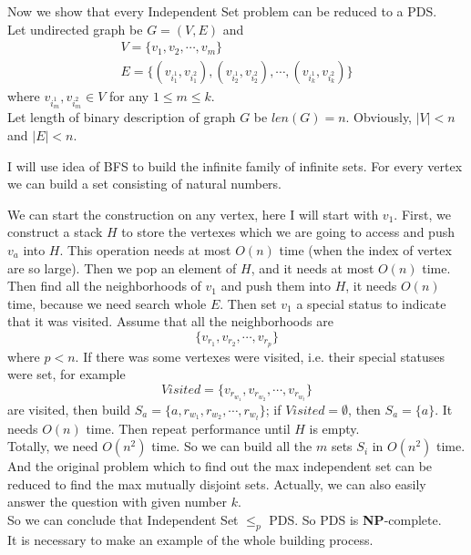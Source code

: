\documentclass[a4papper]{article}
\theoremstyle{neosn}
\begin{document}
    Now we show that every Independent Set problem can be reduced to a PDS. \\

    Let undirected graph be $G=(V,E)$ and
    \[
        \begin{array}{l}
            V =  \{v_1, v_2, \cdots, v_m\} \\
            E =  \{(v_{i_1^1}, v_{i_1^2}), (v_{i_2^1}, v_{i_2^2}), \cdots , (v_{i_k^1}, v_{i_k^2})\}
        \end{array}
    \]
    where $v_{i_m^1}, v_{i_m^2} \in V$ for any $1 \leqslant m \leqslant k$. \\

    Let length of binary description of graph $G$ be $len(G) = n$.
    Obviously, $|V| < n$ and $|E| < n$.

    I will use idea of BFS to build the infinite family of infinite sets.
    For every vertex we can build a set consisting of natural numbers.

    We can start the construction on any vertex, here I will start with $v_1$.
    First, we construct a stack $H$ to store the vertexes which we are going to access and push
    $v_a$ into $H$.
    This operation needs at most $O(n)$ time (when the index of vertex are so large).
    Then we pop an element of $H$, and it needs at most $O(n)$ time.\\
    Then find all the neighborhoods of $v_1$ and push them into $H$, it needs $O(n)$ time,
    because we need search whole $E$.
    Then set $v_1$ a special status to indicate that it was visited.
    Assume that all the neighborhoods are
    \[
        \{v_{r_1}, v_{r_2}, \cdots, v_{r_p}\}
    \]
    where $p < n$.
    If there was some vertexes were visited, i.e. their special statuses were set, for example
    \[
        Visited = \{v_{r_{w_1}}, v_{r_{w_2}}, \cdots, v_{r_{w_t}}\}
    \]
    are visited, then build $S_a = \{a, r_{w_1}, r_{w_2}, \cdots, r_{w_t}\}$;
    if $Visited = \emptyset$, then $S_a = \{a\}$.
    It needs $O(n)$ time.
    Then repeat performance until $H$ is empty.\\
    Totally, we need $O(n^2)$ time.
    So we can build all the $m$ sets $S_i$ in $O(n^2)$ time.
    And the original problem which to find out the max independent set can be reduced to find
    the max mutually disjoint sets.
    Actually, we can also easily answer the question with given number $k$. \\
    So we can conclude that Independent Set $\leqslant_p$ PDS. So PDS is \textbf{NP}-complete. \\

    It is necessary to make an example of the whole building process.\\



    
\end{document}
